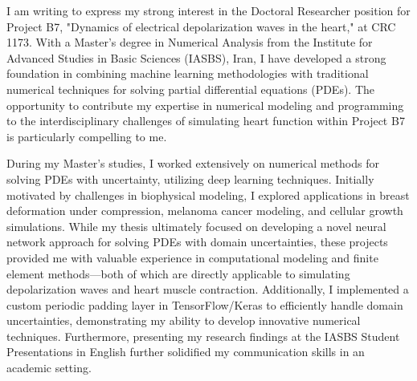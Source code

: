 	\begin{newlfm}
		
		I am writing to express my strong interest in the Doctoral Researcher position for Project B7, "Dynamics of electrical depolarization waves in the heart," at CRC 1173. With a Master's degree in Numerical Analysis from the Institute for Advanced Studies in Basic Sciences (IASBS), Iran, I have developed a strong foundation in combining machine learning methodologies with traditional numerical techniques for solving partial differential equations (PDEs).  The opportunity to contribute my expertise in numerical modeling and programming to the interdisciplinary challenges of simulating heart function within Project B7 is particularly compelling to me.
		

		During my Master’s studies, I worked extensively on numerical methods for solving PDEs with uncertainty, utilizing deep learning techniques. Initially motivated by challenges in biophysical modeling, I explored applications in breast deformation under compression, melanoma cancer modeling, and cellular growth simulations. While my thesis ultimately focused on developing a novel neural network approach for solving PDEs with domain uncertainties, these projects provided me with valuable experience in computational modeling and finite element methods—both of which are directly applicable to simulating depolarization waves and heart muscle contraction. Additionally, I implemented a custom periodic padding layer in TensorFlow/Keras to efficiently handle domain uncertainties, demonstrating my ability to develop innovative numerical techniques. Furthermore, presenting my research findings at the IASBS Student Presentations in English further solidified my communication skills in an academic setting. 
		

\end{newlfm}
